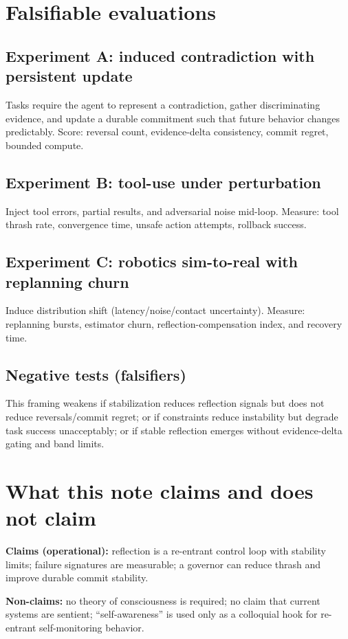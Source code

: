 \documentclass[11pt]{article}
\begin{document}
\section{Falsifiable evaluations}
\subsection{Experiment A: induced contradiction with persistent update}
Tasks require the agent to represent a contradiction, gather discriminating evidence, and update a durable
commitment such that future behavior changes predictably. Score: reversal count, evidence-delta
consistency, commit regret, bounded compute.

\subsection{Experiment B: tool-use under perturbation}
Inject tool errors, partial results, and adversarial noise mid-loop. Measure: tool thrash rate, convergence
time, unsafe action attempts, rollback success.

\subsection{Experiment C: robotics sim-to-real with replanning churn}
Induce distribution shift (latency/noise/contact uncertainty). Measure: replanning bursts, estimator churn,
reflection-compensation index, and recovery time.

\subsection{Negative tests (falsifiers)}
This framing weakens if stabilization reduces reflection signals but does not reduce reversals/commit regret;
or if constraints reduce instability but degrade task success unacceptably; or if stable reflection emerges
without evidence-delta gating and band limits.

\section{What this note claims and does not claim}
\textbf{Claims (operational):} reflection is a re-entrant control loop with stability limits; failure signatures are
measurable; a governor can reduce thrash and improve durable commit stability.

\textbf{Non-claims:} no theory of consciousness is required; no claim that current systems are sentient;
\enquote{self-awareness} is used only as a colloquial hook for re-entrant self-monitoring behavior.
\end{document}
